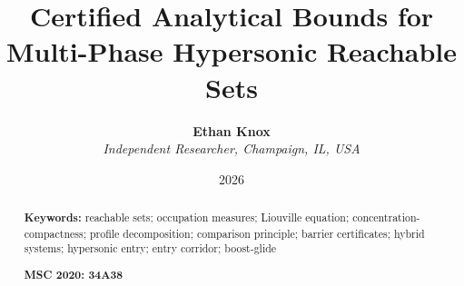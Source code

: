 \documentclass[english,11pt]{extarticle}
\begin{document}
\title{\textbf{Certified Analytical Bounds for Multi-Phase Hypersonic Reachable Sets}}
\author{\textbf{Ethan Knox}\\
\textit{Independent Researcher, Champaign, IL, USA}}
\date{2026}
\maketitle

\begin{abstract}

\bigskip{}

\textbf{Keywords:} reachable sets; occupation measures; Liouville equation;
concentration-compactness; profile decomposition; comparison principle;
barrier certificates; hybrid systems; hypersonic entry; entry corridor;
boost-glide

\medskip{}
\noindent\textbf{MSC 2020: 34A38}

\end{abstract}
\pagebreak{}

\tableofcontents{}
\pagebreak{}


\pagebreak{}


\pagebreak{}


\pagebreak{}


\pagebreak{}


\pagebreak{}


\pagebreak{}


\pagebreak{}



\pagebreak{}

\appendix









\end{document}
